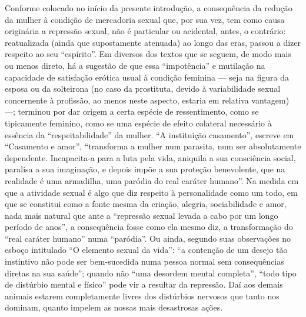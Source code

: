 Conforme colocado no início da presente introdução, a consequência da
redução da mulher à condição de mercadoria sexual que, por sua vez, tem
como causa originária a repressão sexual, não é particular ou acidental,
antes, o contrário: reatualizada (ainda que supostamente atenuada) ao
longo das eras, passou a dizer respeito ao seu ``espírito''. Em diversos
dos textos que se seguem, de modo mais ou menos direto, há a sugestão de
que essa ``impotência'' e mutilação na capacidade de satisfação erótica
usual à condição feminina --- seja na figura da esposa ou da solteirona
(no caso da prostituta, devido à variabilidade sexual concernente à
profissão, ao menos neste aspecto, estaria em relativa vantagem) ---;
terminou por dar origem a certa espécie de ressentimento, como se
tipicamente feminino, como se uma espécie de efeito colateral necessário
à essência da ``respeitabilidade'' da mulher. ``A instituição
casamento'', escreve em ``Casamento e amor'', ``transforma a mulher num
parasita, num ser absolutamente dependente. Incapacita-a para a luta
pela vida, aniquila a sua consciência social, paralisa a sua imaginação,
e depois impõe a sua proteção benevolente, que na realidade é uma
armadilha, uma paródia do real caráter humano''. Na medida em que a
atividade sexual é algo que diz respeito à personalidade como um todo,
em que se constitui como a fonte mesma da criação, alegria,
sociabilidade e amor, nada mais natural que ante a ``repressão sexual
levada a cabo por um longo período de anos'', a consequência fosse como
ela mesmo diz, a transformação do ``real caráter humano'' numa
``paródia''. Ou ainda, segundo suas observações no esboço intitulado ``O
elemento sexual da vida'': ``a contenção de um desejo tão instintivo não
pode ser bem-sucedida numa pessoa normal sem consequências diretas na
sua saúde''; quando não ``uma desordem mental completa'', ``todo tipo de
distúrbio mental e físico'' pode vir a resultar da repressão. Daí aos
demais animais estarem completamente livres dos distúrbios nervosos que
tanto nos dominam, quanto impelem as nossas mais desastrosas ações.

